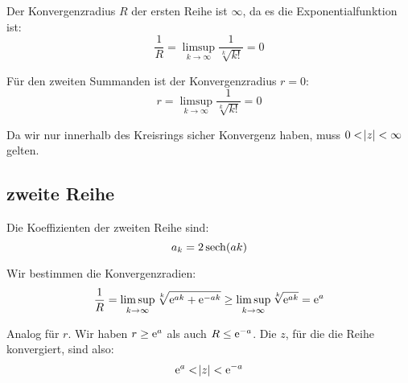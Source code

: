 Der Konvergenzradius $R$ der ersten Reihe ist $\infty$, da es die Exponentialfunktion ist:
\[
	\frac 1R
	= \limsup_{k\to\infty} \frac1{\sqrt[k]{k!}}
	= 0
\]

Für den zweiten Summanden ist der Konvergenzradius $r = 0$:
\[
	r
	= \limsup_{k\to\infty} \frac1{\sqrt[k]{k!}}
	= 0
\]

Da wir nur innerhalb des Kreisrings sicher Konvergenz haben, muss $0 < \abs z <
\infty$ gelten.

\subsection{zweite Reihe}

Die Koeffizienten der zweiten Reihe sind:
\[
	a_k = 2 \operatorname{sech}(ak)
\]

Wir bestimmen die Konvergenzradien:
\[
	\frac 1R
	= \limsup_{k\to\infty} {\sqrt[k]{\mathrm e^{ak} + \mathrm e^{-ak}}}
	\geq \limsup_{k\to\infty} {\sqrt[k]{\mathrm e^{ak}}}
	= \mathrm e^{a}
\]

Analog für $r$. Wir haben $r \geq \mathrm e^a$ als auch $R \leq \mathrm e^{-a}$. Die $z$, für die die Reihe konvergiert, sind also:
\[
	\mathrm e^a < \abs z < \mathrm e^{-a}
\]

%
%



